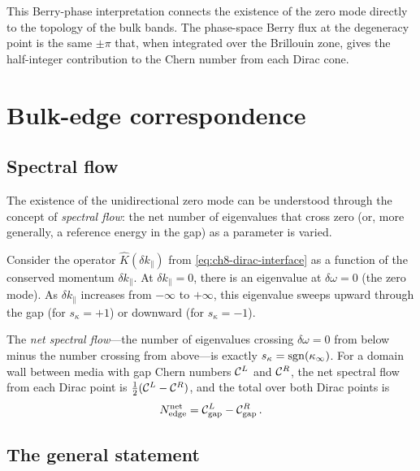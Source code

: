 \begin{remark}
  This Berry-phase interpretation connects the existence of the zero
  mode directly to the topology of the bulk bands.  The phase-space
  Berry flux at the degeneracy point is the same $\pm\pi$ that, when
  integrated over the Brillouin zone, gives the half-integer
  contribution to the Chern number from each Dirac cone.
\end{remark}

\section{Bulk-edge correspondence}
\label{sec:ch8-bec}

\subsection{Spectral flow}
\label{sec:ch8-spectral-flow}

The existence of the unidirectional zero mode can be understood through
the concept of \emph{spectral flow}: the net number of eigenvalues
that cross zero (or, more generally, a reference energy in the gap) as a
parameter is varied.

Consider the operator $\hat{K}(\delta k_\parallel)$ from
\eqref{eq:ch8-dirac-interface} as a function of the conserved momentum
$\delta k_\parallel$.  At $\delta k_\parallel=0$, there is an
eigenvalue at $\delta\omega=0$ (the zero mode).  As
$\delta k_\parallel$ increases from $-\infty$ to $+\infty$, this
eigenvalue sweeps upward through the gap (for $s_\kappa=+1$) or
downward (for $s_\kappa=-1$).

The \emph{net spectral flow}---the number of eigenvalues crossing
$\delta\omega=0$ from below minus the number crossing from above---is
exactly $s_\kappa=\operatorname{sgn}(\kappa_\infty)$.  For a domain wall between
media with gap Chern numbers $\mathcal{C}^L$ and $\mathcal{C}^R$, the net
spectral flow from each Dirac point is
$\frac{1}{2}(\mathcal{C}^L-\mathcal{C}^R)$, and the total over both Dirac
points is
\begin{equation}\label{eq:ch8-spectral-flow}
  N_{\mathrm{edge}}^{\mathrm{net}} = \mathcal{C}^L_{\mathrm{gap}} - \mathcal{C}^R_{\mathrm{gap}}\,.
\end{equation}

\subsection{The general statement}
\label{sec:ch8-bec-general}

